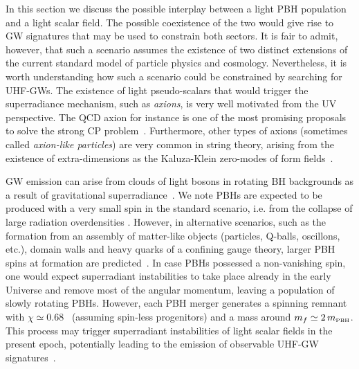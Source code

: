 \documentclass[11pt,a4paper]{article}
\newcommand{\PBH}{\text{\tiny PBH}}
\begin{document}
In this section we discuss the possible interplay between a light PBH population and a light scalar field. The possible coexistence of the two would give rise to GW signatures that may be used to constrain both sectors. 
It is fair to admit, however, that such a scenario assumes the existence of two distinct extensions of the current standard model of particle physics and cosmology. Nevertheless, it is worth understanding how such a scenario could be constrained by searching for UHF-GWs. 
The existence of light pseudo-scalars that would trigger the superradiance mechanism, such as \textit{axions}, is very well motivated from the UV perspective. The QCD axion for instance is one of the most promising proposals to solve the strong CP problem~\cite{Peccei:1977hh, Wilczek:1977pj, Weinberg:1977ma}. Furthermore, other types of axions (sometimes called \textit{axion-like particles}) are very common in string theory, arising from the existence of extra-dimensions as the Kaluza-Klein zero-modes of form fields~\cite{Arvanitaki:2009fg}.


GW emission can arise from clouds of light bosons in rotating BH backgrounds as a result of gravitational superradiance~\cite{Ternov:1978gq,Zouros:1979iw,Arvanitaki:2009fg,Arvanitaki:2010sy, Arvanitaki:2012cn, arXiv:2010.13157, Detweiler:1980uk,Yoshino:2013ofa,Arvanitaki:2014wva,Brito:2014wla,Brito:2015oca}. 
We note PBHs are expected to be produced with a very small spin in the standard scenario, i.e. from the collapse of large radiation overdensities \cite{DeLuca:2019buf,Mirbabayi:2019uph}. 
However, in alternative scenarios, such as the formation from an assembly of matter-like objects (particles, Q-balls, oscillons, etc.), domain walls and heavy quarks of a confining gauge theory, larger PBH spins at formation are predicted~\cite{Harada:2017fjm,Flores:2021tmc,Dvali:2021byy,Eroshenko:2021sez,DeLuca:2021pls,Chongchitnan:2021ehn,deFreitasPacheco:2020wdg}.
In case PBHs possessed a non-vanishing spin, one would expect superradiant instabilities to take place already in the early Universe and remove most of the angular momentum, leaving a population of slowly rotating PBHs. 
However, each PBH merger generates a spinning remnant with $\chi\simeq 0.68$~\cite{Barausse:2009uz} (assuming spin-less progenitors) and a mass around $m_f \simeq 2 \, m_\PBH$. 
This process may trigger superradiant instabilities of light scalar fields in the present epoch, potentially leading to the emission of observable UHF-GW signatures~\cite{Aggarwal:2020umq}.
     
\end{document}
